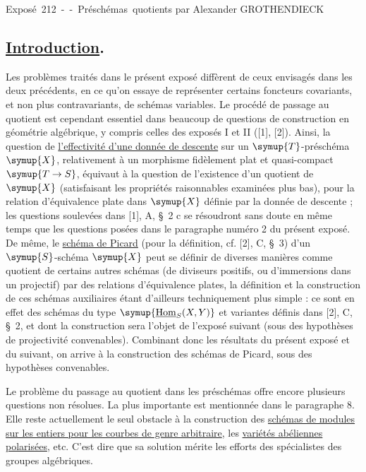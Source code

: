 \unit{Exposé 212 -- Préschémas quotients}
%
  {par Alexander GROTHENDIECK}

\subsection*{\textnormal{\uline{Introduction}.}}

Les problèmes traités dans le présent exposé diffèrent de ceux envisagés dans
les deux précédents, en ce qu'on essaye de représenter certains foncteurs
covariants, et non plus contravariants, de schémas variables. Le procédé de
passage au quotient est cependant essentiel dans beaucoup de questions de
construction en géométrie algébrique, y compris celles des exposés I et II
([1], [2]). Ainsi, la question de \uline{l'effectivité d'une donnée de descente}
sur un $\symup{T}$-préschéma $\symup{X}$, relativement à un morphisme fidèlement plat et
quasi-compact $\symup{T\to S}$, équivaut à la question de l'existence d'un
quotient de $\symup{X}$ (satisfaisant les propriétés raisonnables examinées plus bas),
pour la relation d'équivalence plate dans $\symup{X}$ définie par la donnée de descente ;
les questions soulevées dans [1], A, \S~2 c se résoudront sans doute en même
temps que les questions posées dans le paragraphe numéro 2 du présent exposé.
De même, le \uline{schéma de Picard} (pour la définition, cf. [2], C, \S~3)
d'un $\symup{S}$-schéma $\symup{X}$ peut se définir de diverses manières comme quotient de
certains autres schémas (de diviseurs positifs, ou d'immersions dans un
projectif) par des relations d'équivalence plates, la définition et la
construction de ces schémas auxiliaires étant d'ailleurs techniquement plus
simple : ce sont en effet des schémas du type
$\symup{\underline{\operatorname{Hom}}_S(X,Y)}$ et variantes définis dans [2], C,
\S~2, et dont la construction sera l'objet de l'exposé suivant (sous des
hypothèses de projectivité convenables). Combinant donc les résultats du
présent exposé et du suivant, on arrive à la construction des schémas de
Picard, sous des hypothèses convenables.

Le problème du passage au quotient dans les préschémas offre encore plusieurs
questions non résolues. La plus importante est mentionnée dans le paragraphe
8. Elle reste actuellement le seul obstacle à la construction des
\uline{schémas de modules sur les entiers pour les courbes de genre arbitraire},
les \uline{variétés abéliennes polarisées}, etc. C'est dire que sa solution mérite les
efforts des spécialistes des groupes algébriques.

